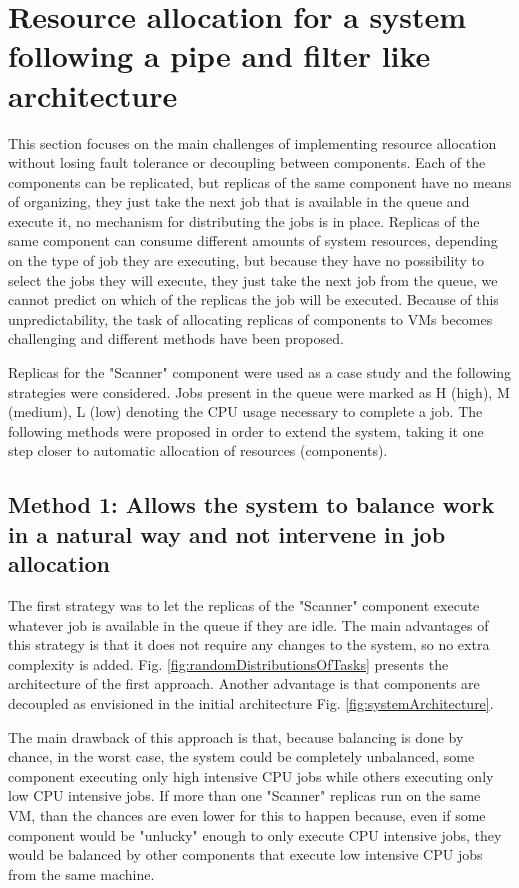 \section{Resource allocation for a system following a pipe and filter like architecture}
\label{sec:resourceAllocation}
This section focuses on the main challenges of implementing resource allocation without losing fault tolerance or decoupling between components. Each of the components can be replicated, but replicas of the same component have no means of organizing, they just take the next job that is available in the queue and execute it, no mechanism for distributing the jobs is in place. Replicas of the same component can consume different amounts of system resources, depending on the type of job they are executing, but because they have no possibility to select the jobs they will execute, they just take the next job from the queue, we cannot predict on which of the replicas the job will be executed. Because of this unpredictability, the task of allocating replicas of components to VMs becomes challenging and different methods have been proposed.

Replicas for the "Scanner" component were used as a case study and the following strategies were considered. Jobs present in the queue were marked as H (high), M (medium), L (low) denoting the CPU usage necessary to complete a job. The following methods were proposed in order to extend the system, taking it one step closer to automatic allocation of resources (components).

\subsection{Method 1: Allows the system to balance work in a natural way and not intervene in job allocation}
\label{subsection:method1}
The first strategy was to let the replicas of the "Scanner" component execute whatever job is available in the queue if they are idle. The main advantages of this strategy is that it does not require any changes to the system, so no extra complexity is added. Fig. \ref{fig:randomDistributionsOfTasks} presents the architecture of the first approach. Another advantage is that components are decoupled as envisioned in the initial architecture Fig. \ref{fig:systemArchitecture}.

The main drawback of this approach is that, because balancing is done by chance, in the worst case, the system could be completely unbalanced, some component executing only high intensive CPU jobs while others executing only low CPU intensive jobs. If more than one "Scanner" replicas run on the same VM, than the chances are even lower for this to happen because, even if some component would be "unlucky" enough to only execute CPU intensive jobs, they would be balanced by other components that execute low intensive CPU jobs from the same machine.

